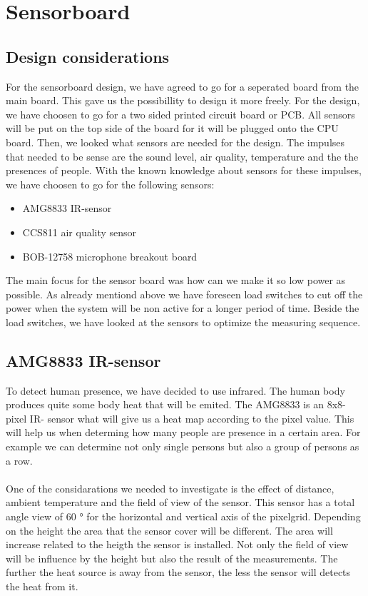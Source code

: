\documentclass[11pt,a4paper]{article}
\begin{document}
\newpage
\section{Sensorboard}
\subsection{Design considerations}
For the sensorboard design, we have agreed to go for a seperated board from the main board. This gave us the possibillity to design it more freely. For the design, we have choosen to go for a two sided printed circuit board or PCB. All sensors will be put on the top side of the board for it will be plugged onto the CPU board. Then, we looked what sensors are needed for the design. The impulses that needed to be sense are the sound level, air quality, temperature and the the presences of people.
With the known knowledge about sensors for these impulses, we have choosen to go for the following sensors:

\begin{itemize}
	\item AMG8833 IR-sensor
	\item CCS811 air quality sensor
	\item BOB-12758 microphone breakout board
\end{itemize}


The main focus for the sensor board was how can we make it so low power as possible. As already mentiond above we have foreseen load switches to cut off the power when the system will be non active for a longer period of time. Beside the load switches, we have looked at the sensors to optimize the measuring sequence.

\subsection{AMG8833 IR-sensor}
To detect human presence, we have decided to use infrared. The human body produces quite some body heat that will be emited. The AMG8833  is an 8x8-pixel IR- sensor what will give us a heat map according to the pixel value. This will help us when determing how many people are presence in a certain area. For example we can determine not only single persons but also a group of persons as a row.
\\ \\
One of the considarations we needed to investigate is the effect of distance, ambient temperature and the field of view of the sensor. This sensor has a total angle view of 60 ° for the horizontal and vertical axis of the pixelgrid. Depending on the height the area that the sensor cover will be different. The area will increase related to the heigth the sensor is installed. Not only the field of view will be influence by the height but also the result of the measurements. The further the heat source is away from the sensor, the less the sensor will detects the heat from it. 
\end{document}

